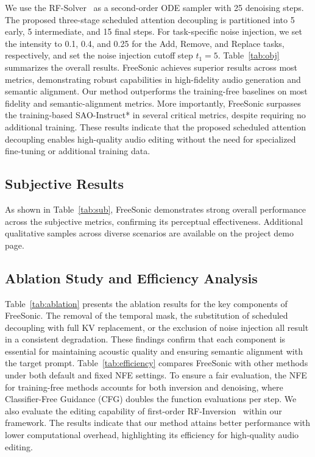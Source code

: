 We use the RF-Solver~\cite{wang2024taming} as a second-order ODE sampler with 25 denoising steps. The proposed three-stage scheduled attention decoupling is partitioned into 5 early, 5 intermediate, and 15 final steps. For task-specific noise injection, we set the intensity to 0.1, 0.4, and 0.25 for the Add, Remove, and Replace tasks, respectively, and set the noise injection cutoff step $t_1 = 5$. Table~\ref{tab:obj} summarizes the overall results. FreeSonic achieves superior results across most metrics, demonstrating robust capabilities in high-fidelity audio generation and semantic alignment. Our method outperforms the training-free baselines on most fidelity and semantic-alignment metrics. More importantly, FreeSonic surpasses the training-based SAO-Instruct* in several critical metrics, despite requiring no additional training. These results indicate that the proposed scheduled attention decoupling enables high-quality audio editing without the need for specialized fine-tuning or additional training data.

\subsection{Subjective Results}
As shown in Table~\ref{tab:sub}, FreeSonic demonstrates strong overall performance across the subjective metrics, confirming its perceptual effectiveness.
Additional qualitative samples across diverse scenarios are available on the project demo page.

\subsection{Ablation Study and Efficiency Analysis}

Table~\ref{tab:ablation} presents the ablation results for the key components of FreeSonic. The removal of the temporal mask, the substitution of scheduled decoupling with full KV replacement, or the exclusion of noise injection all result in a consistent degradation. These findings confirm that each component is essential for maintaining acoustic quality and ensuring semantic alignment with the target prompt.
Table~\ref{tab:efficiency} compares FreeSonic with other methods under both default and fixed NFE settings.
To ensure a fair evaluation, the NFE for training-free methods accounts for both inversion and denoising, where Classifier-Free Guidance (CFG) doubles the function evaluations per step.
We also evaluate the editing capability of first-order RF-Inversion~\cite{rout2024semantic} within our framework. The results indicate that our method attains better performance with lower computational overhead, highlighting its efficiency for high-quality audio editing.


